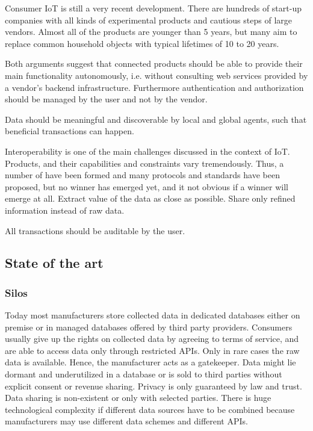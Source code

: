 Consumer IoT is still a very recent development. There are hundreds of start-up companies with all kinds of experimental products and cautious steps of large vendors. Almost all of the products are younger than 5 years, but many aim to replace common household objects with typical lifetimes of 10 to 20 years. 

Both arguments suggest that connected products should be able to provide their main functionality autonomously, i.e. without consulting web services provided by a vendor’s backend infrastructure. Furthermore authentication and authorization should be managed by the user and not by the vendor.


Data should be meaningful and discoverable by local and global agents, such that beneficial transactions can happen.

Interoperability is one of the main challenges discussed in the context of IoT. Products, and their capabilities and constraints vary tremendously. Thus, a number of have been formed and many protocols and standards have been proposed, but no winner has emerged yet, and it not obvious if a winner will emerge at all. 
Extract value of the data as close as possible. Share only refined information instead of raw data.


All transactions should be auditable by the user.


\subsection{State of the art}


\subsubsection{Silos}

Today most manufacturers store collected data in dedicated databases either on premise or in managed databases offered by third party providers. Consumers usually give up the rights on collected data by agreeing to terms of service, and are able to access data only through  restricted APIs. Only in rare cases the raw data is available. Hence, the manufacturer acts as a gatekeeper. Data might lie dormant and underutilized in a database or is sold to third parties without explicit consent or revenue sharing. Privacy is only guaranteed by law and trust. Data sharing is non-existent or only with selected parties. There is huge technological complexity if different data sources have to be combined because manufacturers may use different data schemes and different APIs. 

